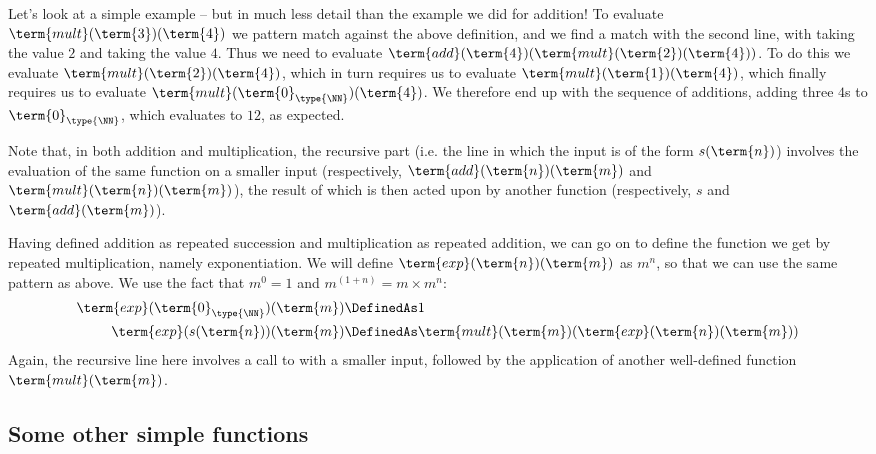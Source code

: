 Let's look at a simple example -- but in much less detail than the example we did for addition!  To evaluate 
$\term{mult}(\term{3})(\term{4})$
we pattern match against the above definition, and we find a match with the second line, with  taking the value $2$ and  taking the value $4$.  Thus we need to evaluate
$\term{add}(\term{4})(\term{mult}(\term{2})(\term{4}))$.  To do this we evaluate 
$\term{mult}(\term{2})(\term{4})$, which in turn requires us to evaluate
$\term{mult}(\term{1})(\term{4})$, which finally requires us to evaluate
$\term{mult}(\term{0}_{\type{\NN}})(\term{4})$.  We therefore end up with the sequence of additions, adding three $4$s to $\term{0}_{\type{\NN}}$, which evaluates to $12$, as expected.

Note that, in both addition and multiplication, the recursive part (i.e. the line in which the input is of the form $s(\term{n})$)
involves the evaluation of the same function on a smaller input (respectively, 
$\term{add}(\term{n})(\term{m})$
and 
$\term{mult}(\term{n})(\term{m})$), 
the result of which is then acted upon by another function
(respectively,
$s$ and 
$\term{add}(\term{m})$).

Having defined addition as repeated succession and multiplication as repeated addition, we can go on to define the function we get by repeated multiplication, namely exponentiation.  We will define 
$\term{exp}(\term{n})(\term{m})$ as $m^n$, so that we can use the same pattern as above.  We use the fact that $m^0 = 1$ and $m^{(1+n)} = m \times m^n$:
\begin{align*}
\term{exp}(\term{0}_{\type{\NN}})(\term{m}) &\DefinedAs 1
\\
\term{exp}(s(\term{n}))(\term{m}) &\DefinedAs
\term{mult}(\term{m})(\term{exp}(\term{n})(\term{m}))
\end{align*}
Again, the recursive line here involves a call to  with a smaller input, followed by the application of another well-defined function $\term{mult}(\term{m})$.


\subsection{Some other simple functions}
\label{sec:NaturalNumbers-OtherFunctions}

